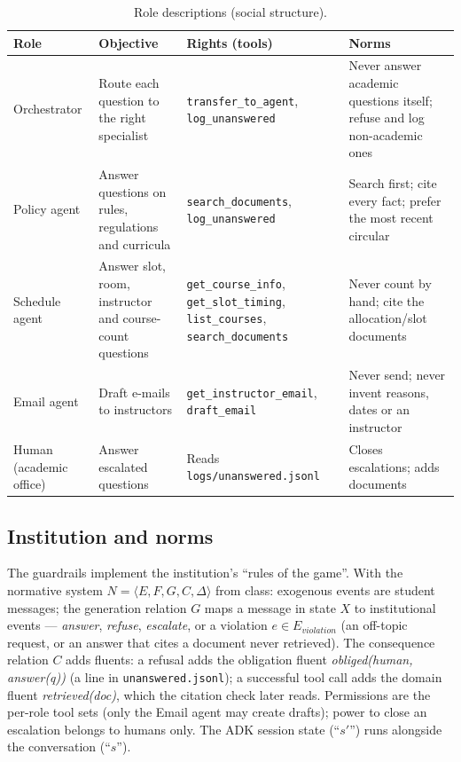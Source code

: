 \documentclass[11pt,a4paper]{article}
\begin{document}
\begin{table}[h]
\centering\small
\caption{Role descriptions (social structure).}
\label{tab:roles}
\begin{tabular}{>{\raggedright\arraybackslash}p{2.2cm}>{\raggedright\arraybackslash}p{4.0cm}>{\raggedright\arraybackslash}p{4.3cm}>{\raggedright\arraybackslash}p{4.2cm}}
\toprule
Role & Objective & Rights (tools) & Norms \\
\midrule
Orchestrator & Route each question to the right specialist & \texttt{transfer\_to\_agent}, \texttt{log\_unanswered} & Never answer academic questions itself; refuse and log non-academic ones \\
Policy agent & Answer questions on rules, regulations and curricula & \texttt{search\_documents}, \texttt{log\_unanswered} & Search first; cite every fact; prefer the most recent circular \\
Schedule agent & Answer slot, room, instructor and course-count questions & \texttt{get\_course\_info}, \texttt{get\_slot\_timing}, \texttt{list\_courses}, \texttt{search\_documents} & Never count by hand; cite the allocation/slot documents \\
Email agent & Draft e-mails to instructors & \texttt{get\_instructor\_email}, \texttt{draft\_email} & Never send; never invent reasons, dates or an instructor \\
Human (academic office) & Answer escalated questions & Reads \texttt{logs/unanswered.jsonl} & Closes escalations; adds documents \\
\bottomrule
\end{tabular}
\end{table}

\subsection{Institution and norms}\label{sec:institution}
The guardrails implement the institution's ``rules of the game''. With the normative system
$N=\langle E,F,G,C,\Delta\rangle$ from class: exogenous events are student messages; the generation
relation $G$ maps a message in state $X$ to institutional events --- \emph{answer}, \emph{refuse},
\emph{escalate}, or a violation $e\in E_{\mathit{violation}}$ (an off-topic request, or an answer that cites a
document never retrieved). The consequence relation $C$ adds fluents: a refusal adds the obligation fluent
\textit{obliged(human, answer(q))} (a line in \texttt{unanswered.jsonl}); a successful tool call adds the
domain fluent \textit{retrieved(doc)}, which the citation check later reads. Permissions are the per-role
tool sets (only the Email agent may create drafts); power to close an escalation belongs to humans only.
The ADK session state (``$s'$'') runs alongside the conversation (``$s$'').
\end{document}
